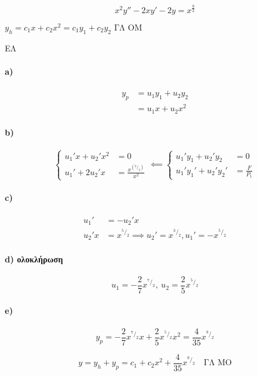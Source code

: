 \documentclass[11pt,a4paper,titlepage,final]{article}
\begin{document}
\begin{exercise*}{6.1}
	\[
	x^2y'' -2xy' -2y = x^{\frac{9}{2}}
	\]

	\(
	y_h = c_1x+c_2x^2 = c_1y_1 + c_2y_2 \text{ ΓΛ ΟΜ}
	\)

		\tcblower
	ΕΛ
	\paragraph{\textlatin{a})}
	\begin{align*}
	y_p &= u_1y_1 + u_2y_2 \\
	    &= u_1x   + u_2x^2
	\end{align*}

	\paragraph{\textlatin{b})}\[
	\begin{cases}
	u_1'x+u_2'x^2 &=0 \\
	u_1' + 2u_2'x &= \frac{x^{\left( ^9/_2\right)}}{x^2}
	\end{cases} \impliedby \begin{cases}
	u_1'y_1+u_2'y_2 &= 0\\
	u_1'y_1'+u_2'y_2' &= \frac{F}{P_1}
	\end{cases}
	\]

	\paragraph{\textlatin{c})}
	\begin{align*}
	u_1' &= -u_2' x\\
	u_2'x &= x ^ {^5/_2} \implies u_2' = x^{^3/_2}, u_1' = -x^{^5/_2}
	\end{align*}

	\paragraph{\textlatin{d}) ολοκλήρωση}
	\[
	u_1=-\frac{2}{7}x^{^7/_2},\ u_2=\frac{2}{5}x^{^5/_2}
	\]

	\paragraph{\textlatin{e})}
	\[
	y_p = -\frac{2}{7}x^{^7/_2}x + \frac{2}{5}x^{^5/_2}x^2 = \frac{4}{35}x^{^9/_2}
	\]

	\[
	\boxed{
		y=y_h+y_p=c_1+c_2x^2+\frac{4}{35}x^{^9/_2}
		} \quad \text{ΓΛ ΜΟ}
	\]
\end{exercise*}
\end{document}
